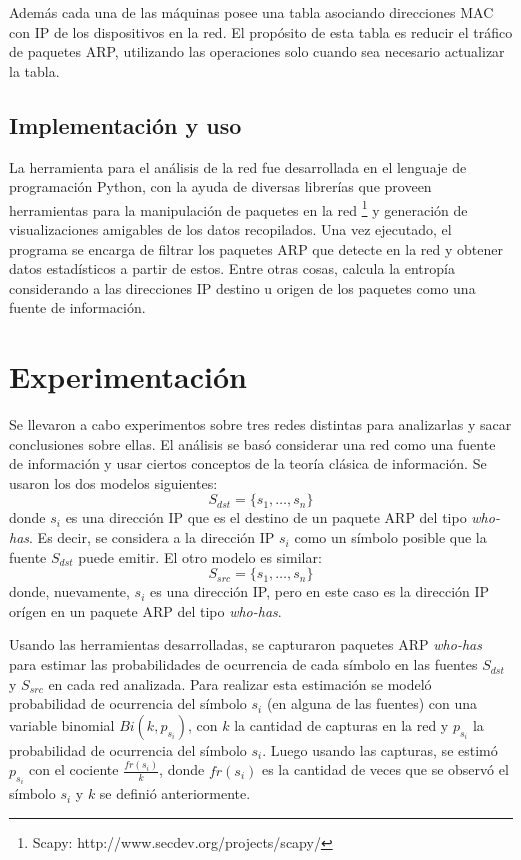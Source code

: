 Además cada una de las máquinas posee una tabla asociando direcciones MAC con IP de los dispositivos en la red. El propósito de esta tabla es reducir el tráfico de paquetes ARP, utilizando las operaciones solo cuando sea necesario actualizar la tabla.

\subsection{Implementación y uso}
La herramienta para el análisis de la red fue desarrollada en el lenguaje de programación Python, con la ayuda de diversas librerías que proveen herramientas para la manipulación de paquetes en la red \footnote{Scapy: http://www.secdev.org/projects/scapy/} y generación de visualizaciones amigables de los datos recopilados. Una vez ejecutado, el programa se encarga de filtrar los paquetes ARP que detecte en la red y obtener datos estadísticos a partir de estos. Entre otras cosas, calcula la entropía considerando a las direcciones IP destino u origen de los paquetes como una fuente de información.

\section{Experimentación}
Se llevaron a cabo experimentos sobre tres redes distintas para analizarlas y sacar conclusiones sobre ellas. El análisis se basó considerar una red como una fuente de información y usar ciertos conceptos de la teoría clásica de información. Se usaron los dos modelos siguientes:
$$ S_{dst} = \{s_1, \dots, s_n \} $$
donde $s_i$ es una dirección IP que es el destino de un paquete ARP del tipo \textit{who-has}. Es decir, se considera a la dirección IP $s_i$ como un símbolo posible que la fuente $S_{dst}$ puede emitir. El otro modelo es similar:
$$ S_{src} = \{s_1, \dots, s_n \} $$
donde, nuevamente, $s_i$ es una dirección IP, pero en este caso es la dirección IP orígen en un paquete ARP del tipo \textit{who-has}.
\par Usando las herramientas desarrolladas, se capturaron paquetes ARP \textit{who-has} para estimar las probabilidades de ocurrencia de cada símbolo en las fuentes $S_{dst}$ y $S_{src}$ en cada red analizada. Para realizar esta estimación se modeló probabilidad de ocurrencia del símbolo $s_i$ (en alguna de las fuentes) con una variable binomial $Bi(k, p_{s_i})$, con $k$ la cantidad de capturas en la red y $p_{s_i}$ la probabilidad de ocurrencia del símbolo $s_i$. Luego usando las capturas, se estimó $p_{s_i}$ con el cociente $\frac{fr(s_i)}{k}$, donde $fr(s_i)$ es la cantidad de veces que se observó el símbolo $s_i$ y $k$ se definió anteriormente.

